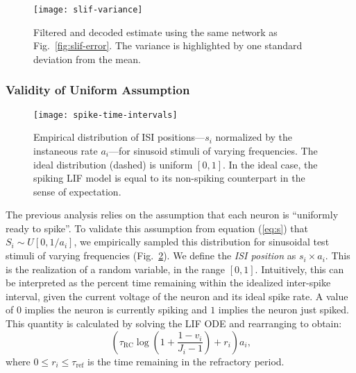 \begin{figure}[h!]
\centering
\texttt{[image: slif-variance]}
\caption{\label{fig:slif-variance} Filtered and decoded estimate using the same network as Fig.~\ref{fig:slif-error}. The variance is highlighted by one standard deviation from the mean.}
\end{figure}

\subsubsection{Validity of Uniform Assumption}

\begin{figure}[h!]
\centering
\texttt{[image: spike-time-intervals]}
\caption{\label{fig:spike-time-intervals} Empirical distribution of ISI positions---$s_i$ normalized by the instaneous rate $a_i$---for sinusoid stimuli of varying frequencies.
  The ideal distribution (dashed) is uniform $[0, 1]$. In the ideal case, the spiking LIF model is equal to its non-spiking counterpart in the sense of expectation.
}
\end{figure}

The previous analysis relies on the assumption that each neuron is ``uniformly ready to spike''.
To validate this assumption from equation (\ref{eq:s}) that $S_i \sim U[0, 1/a_i]$, we empirically sampled this distribution for sinusoidal test stimuli of varying frequencies (Fig.~\ref{fig:spike-time-intervals}).
We define the \emph{ISI position} as $s_i \times a_i$. This is the realization of a random variable, in the range $[0, 1]$.
Intuitively, this can be interpreted as the percent time remaining within the idealized inter-spike interval, given the current voltage of the neuron and its ideal spike rate.
A value of $0$ implies the neuron is currently spiking and $1$ implies the neuron just spiked.
This quantity is calculated by solving the LIF ODE and rearranging to obtain:
\begin{equation}
\left(\tau_\text{RC} \log\left(1 + \frac{1 - v_i}{J_i - 1}\right) + r_i \right) a_i \text{,}
\end{equation}
where $0 \le r_i \le \tau_\text{ref}$ is the time remaining in the refractory period.

